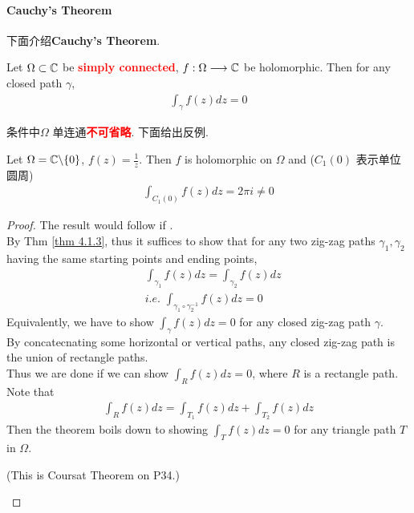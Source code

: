 \paragraph{Cauchy's Theorem}
下面介绍\textbf{Cauchy's Theorem}.
\begin{thm}\label{thm 4.3.2}
	Let $\Omega \subset \mathbb{C}$ be \textcolor{red}{\textbf{simply connected}}, $f : \Omega \longrightarrow \mathbb{C}$ be holomorphic. Then for any closed path $\gamma$,
	\begin{align}
		\int_{\gamma}{f(z) dz} = 0
	\end{align}
	
	\vspace{1em}
	\begin{rmk}
		条件中$\Omega$ 单连通\textcolor{red}{\textbf{不可省略}}. 下面给出反例.
		\begin{example}\label{ex 4.3.2}
			Let $\Omega = \mathbb{C} \backslash \{ 0 \}$, $f(z) = \frac{1}{z}$. Then $f$ is holomorphic on $\Omega$ and ($C_{1}(0)$ 表示单位圆周)
			\begin{align}
				\int_{C_{1}(0)}{f(z) dz} = 2\pi i \neq 0
			\end{align}
		\end{example}
	\end{rmk}
	
	\vspace{2em}
	\begin{proof}
		The result would follow if . \\
		By Thm \ref{thm 4.1.3}, thus it suffices to show that for any two zig-zag paths $\gamma_1 , \gamma_2$ having the same starting points and ending points,
		\begin{align}
			&\int_{\gamma_1}{f(z) dz} = \int_{\gamma_2}{f(z) dz} \\
			&i.e. \,\, \int_{\gamma_{1} \circ \gamma_{2}^{-1}}{f(z) dz} = 0
		\end{align}
		Equivalently, we have to show $\int_{\gamma}{f(z) dz} = 0$ for any closed zig-zag path $\gamma$.\\
		By concatecnating some horizontal or vertical paths, any closed zig-zag path is the union of rectangle paths.\\
		Thus we are done if we can show $\int_{R}{f(z) dz} = 0$, where $R$ is a rectangle path.\\
		Note that 
		\begin{align}
			\int_{R}{f(z) dz} = \int_{T_1}{f(z) dz} + \int_{T_2}{f(z) dz}
		\end{align}
		Then the theorem boils down to showing $\int_{T}{f(z) dz} = 0$ for any triangle path $T$ in $\Omega$.
		\begin{center}
			(This is Coursat Theorem on P34.)
		\end{center}
	\end{proof}
\end{thm}

